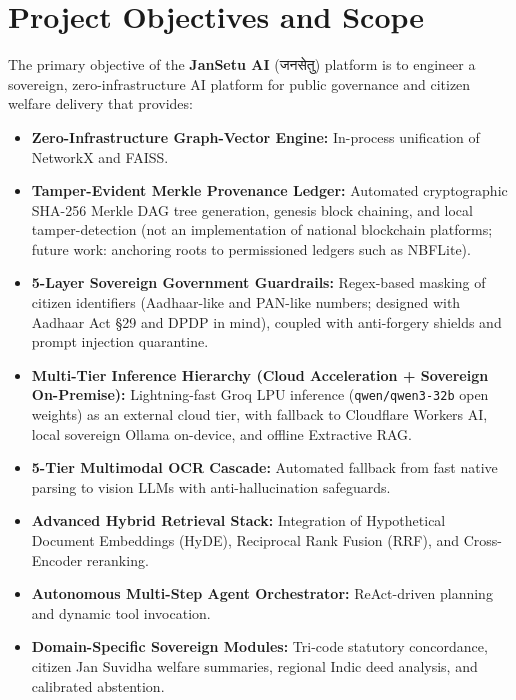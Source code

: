 \documentclass[12pt,a4paper,oneside]{report}
\begin{document}
\section{Project Objectives and Scope}
The primary objective of the \textbf{JanSetu AI} (जनसेतु) platform is to engineer a sovereign, zero-infrastructure AI platform for public governance and citizen welfare delivery that provides:
\begin{itemize}[itemsep=2pt]
    \item \textbf{Zero-Infrastructure Graph-Vector Engine:} In-process unification of NetworkX and FAISS.
    \item \textbf{Tamper-Evident Merkle Provenance Ledger:} Automated cryptographic SHA-256 Merkle DAG tree generation, genesis block chaining, and local tamper-detection (not an implementation of national blockchain platforms; future work: anchoring roots to permissioned ledgers such as NBFLite).
    \item \textbf{5-Layer Sovereign Government Guardrails:} Regex-based masking of citizen identifiers (Aadhaar-like and PAN-like numbers; designed with Aadhaar Act §29 and DPDP in mind), coupled with anti-forgery shields and prompt injection quarantine.
    \item \textbf{Multi-Tier Inference Hierarchy (Cloud Acceleration + Sovereign On-Premise):} Lightning-fast Groq LPU inference (\texttt{qwen/qwen3-32b} open weights) as an external cloud tier, with fallback to Cloudflare Workers AI, local sovereign Ollama on-device, and offline Extractive RAG.
    \item \textbf{5-Tier Multimodal OCR Cascade:} Automated fallback from fast native parsing to vision LLMs with anti-hallucination safeguards.
    \item \textbf{Advanced Hybrid Retrieval Stack:} Integration of Hypothetical Document Embeddings (HyDE), Reciprocal Rank Fusion (RRF), and Cross-Encoder reranking.
    \item \textbf{Autonomous Multi-Step Agent Orchestrator:} ReAct-driven planning and dynamic tool invocation.
    \item \textbf{Domain-Specific Sovereign Modules:} Tri-code statutory concordance, citizen Jan Suvidha welfare summaries, regional Indic deed analysis, and calibrated abstention.
\end{itemize}
\end{document}
